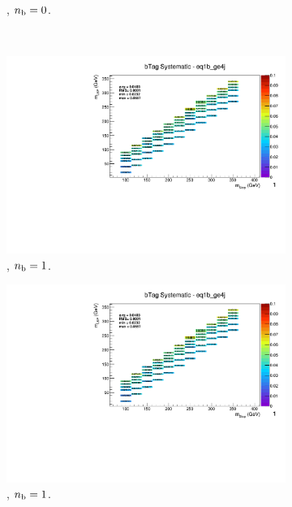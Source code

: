 \begin{figure}[ht!]
\begin{subfigure}[b]{0.32\textwidth}
    \caption{\njhigh, $n_{\text{b}} = 0$.}
  \end{subfigure}\\
  \begin{subfigure}[b]{0.32\textwidth}
    \includegraphics[width=\textwidth, page=12]{Figs/sms/t2cc/v37/systs_v2/T2cc_bTag_eq1b_ge4j.pdf}
    \caption{\njhigh, $n_{\text{b}} = 1$.}
  \end{subfigure}
  \begin{subfigure}[b]{0.32\textwidth}
    \includegraphics[width=\textwidth, page=8]{Figs/sms/t2cc/v37/systs_v2/T2cc_bTag_eq1b_ge4j.pdf}
    \caption{\njhigh, $n_{\text{b}} = 1$.}
  \end{subfigure}
  \begin{subfigure}[b]{0.32\textwidth}

\end{subfigure}
\end{figure}
